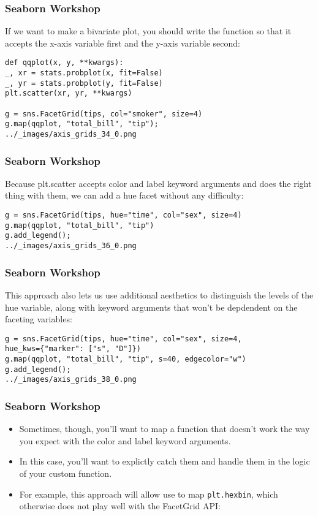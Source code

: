 \documentclass{beamer}
\begin{document}
\begin{frame}[fragile]
\frametitle{Seaborn Workshop}
\large
If we want to make a bivariate plot, you should write the function so that it accepts the x-axis variable first and the y-axis variable second:
\begin{framed}
\begin{verbatim}
def qqplot(x, y, **kwargs):
_, xr = stats.probplot(x, fit=False)
_, yr = stats.probplot(y, fit=False)
plt.scatter(xr, yr, **kwargs)

g = sns.FacetGrid(tips, col="smoker", size=4)
g.map(qqplot, "total_bill", "tip");
../_images/axis_grids_34_0.png
\end{verbatim}
\end{framed}
\end{frame}
\begin{frame}[fragile]
\frametitle{Seaborn Workshop}
\large
Because plt.scatter accepts color and label keyword arguments and does the right thing with them, we can add a hue facet without any difficulty:
\begin{verbatim}
g = sns.FacetGrid(tips, hue="time", col="sex", size=4)
g.map(qqplot, "total_bill", "tip")
g.add_legend();
../_images/axis_grids_36_0.png
\end{verbatim}

\end{frame}
\begin{frame}[fragile]
	\frametitle{Seaborn Workshop}
	\large
This approach also lets us use additional aesthetics to distinguish the levels of the hue variable, along with keyword arguments that won’t be depdendent on the faceting variables:
\begin{verbatim}
g = sns.FacetGrid(tips, hue="time", col="sex", size=4,
hue_kws={"marker": ["s", "D"]})
g.map(qqplot, "total_bill", "tip", s=40, edgecolor="w")
g.add_legend();
../_images/axis_grids_38_0.png
\end{verbatim}

\end{frame}
\begin{frame}[fragile]
\frametitle{Seaborn Workshop}
\large
\begin{itemize}
\item Sometimes, though, you’ll want to map a function that doesn’t work the way you expect with the color and label keyword arguments. 
\item In this case, you’ll want to explictly catch them and handle them in the logic of your custom function.
\item  For example, this approach will allow use to map \texttt{plt.hexbin}, which otherwise does not play well with the FacetGrid API:
\end{itemize}

\end{frame}
\end{document}
